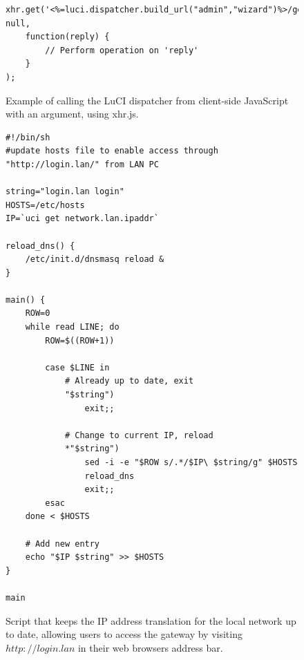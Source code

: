\documentclass[a4paper,11pt,makeidx]{kth-bcs}
\begin{document}
   \begin{figure}[h!]
   \centering
      \lstset{language=java}
      \begin{lstlisting}
xhr.get('<%=luci.dispatcher.build_url("admin","wizard")%>/get_list/'+argument, null,
    function(reply) {
        // Perform operation on 'reply'
    }
);
      \end{lstlisting}
      \caption{
         \small{
Example of calling the LuCI dispatcher from client-side JavaScript with an argument, using xhr.js.
         }
      }
      \label{fig:javascript}
   \end{figure}

   \begin{figure}[h!]
   \centering
      \lstset{language=sh}
      \begin{lstlisting}
#!/bin/sh
#update hosts file to enable access through "http://login.lan/" from LAN PC

string="login.lan login"
HOSTS=/etc/hosts
IP=`uci get network.lan.ipaddr`

reload_dns() {
    /etc/init.d/dnsmasq reload &
}

main() {
    ROW=0
    while read LINE; do
        ROW=$((ROW+1))

        case $LINE in
            # Already up to date, exit
            "$string")
                exit;;

            # Change to current IP, reload
            *"$string")
                sed -i -e "$ROW s/.*/$IP\ $string/g" $HOSTS
                reload_dns
                exit;;
        esac
    done < $HOSTS

    # Add new entry
    echo "$IP $string" >> $HOSTS
}

main
      \end{lstlisting}
      \caption{
         \small{
Script that keeps the IP address translation for the local network up to date, allowing users to access the gateway by visiting $http://login.lan$ in their web browsers address bar.
         }
      }
      \label{fig:javascript}
   \end{figure}



\end{document}
